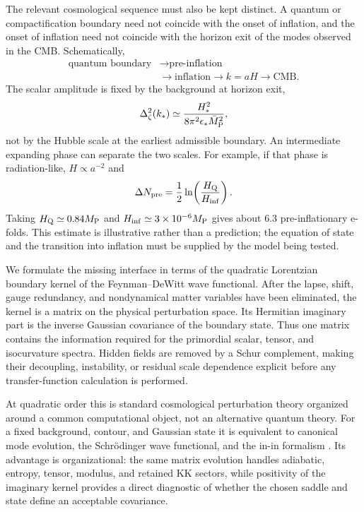\documentclass[aps,prd,twocolumn,superscriptaddress,nofootinbib,longbibliography,floatfix]{revtex4-2}
\newcommand{\Mpl}{\bar M_{\rm P}}
\begin{document}
The relevant cosmological sequence must also be kept distinct.  A quantum or compactification boundary need not coincide with the onset of inflation, and the onset of inflation need not coincide with the horizon exit of the modes observed in the CMB.  Schematically,
\begin{equation}
\begin{split}
\text{quantum boundary}&\longrightarrow\text{pre-inflation}\nonumber\\
&\longrightarrow\text{inflation}\longrightarrow k=aH\longrightarrow\text{CMB}.
\end{split}
\end{equation}
The scalar amplitude is fixed by the background at horizon exit,
\begin{equation}
\Delta_\zeta^2(k_*)\simeq
\frac{H_*^2}{8\pi^2\epsilon_*\Mpl^2},
\end{equation}
not by the Hubble scale at the earliest admissible boundary.  An intermediate expanding phase can separate the two scales.  For example, if that phase is radiation-like, $H\propto a^{-2}$ and
\begin{equation}
\Delta N_{\rm pre}=\frac12\ln\!\left(\frac{H_{\rm Q}}{H_{\rm inf}}\right).
\end{equation}
Taking $H_{\rm Q}\simeq0.84M_{\rm P}$ and $H_{\rm inf}\simeq3\times10^{-6}M_{\rm P}$ gives about $6.3$ pre-inflationary e-folds.  This estimate is illustrative rather than a prediction; the equation of state and the transition into inflation must be supplied by the model being tested.

We formulate the missing interface in terms of the quadratic Lorentzian boundary kernel of the Feynman--DeWitt wave functional.  After the lapse, shift, gauge redundancy, and nondynamical matter variables have been eliminated, the kernel is a matrix on the physical perturbation space.  Its Hermitian imaginary part is the inverse Gaussian covariance of the boundary state.  Thus one matrix contains the information required for the primordial scalar, tensor, and isocurvature spectra.  Hidden fields are removed by a Schur complement, making their decoupling, instability, or residual scale dependence explicit before any transfer-function calculation is performed.

At quadratic order this is standard cosmological perturbation theory organized around a common computational object, not an alternative quantum theory.  For a fixed background, contour, and Gaussian state it is equivalent to canonical mode evolution, the Schr\"odinger wave functional, and the in-in formalism \cite{HalliwellHawking1985,PolarskiStarobinsky1996,Maldacena2003}.  Its advantage is organizational: the same matrix evolution handles adiabatic, entropy, tensor, modulus, and retained KK sectors, while positivity of the imaginary kernel provides a direct diagnostic of whether the chosen saddle and state define an acceptable covariance.
\end{document}
